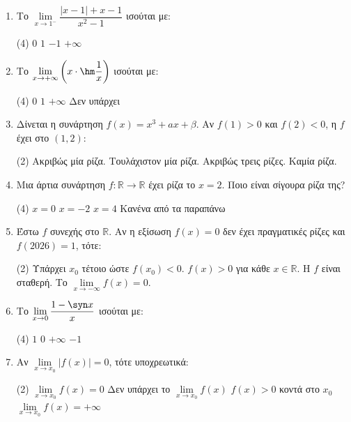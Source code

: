 \begin{enumerate}[label=\textbf{1.\arabic*.}, itemsep=4mm]
    \item Το $\lim\limits_{x \to 1^-} \dfrac{|x-1| + x - 1}{x^2 - 1}$ ισούται με:
    \begin{tasks}[label=\let\textdexiakeraia\relax\alph*.](4)
        \task $0$
        \task $1$
        \task $-1$
        \task $+\infty$
    \end{tasks}

    \item Το $\lim\limits_{x \to +\infty} \left( x \cdot \hm \dfrac{1}{x} \right)$ ισούται με:
    \begin{tasks}[label=\let\textdexiakeraia\relax\alph*.](4)
        \task $0$
        \task $1$
        \task $+\infty$
        \task Δεν υπάρχει
    \end{tasks}

    \item Δίνεται η συνάρτηση $f(x) = x^3 + a x + \beta$. Αν $f(1)>0$ και $f(2)<0$, η $f$ έχει στο $(1,2)$:
    \begin{tasks}[label=\let\textdexiakeraia\relax\alph*.](2)
        \task Ακριβώς μία ρίζα.
        \task Τουλάχιστον μία ρίζα.
        \task Ακριβώς τρεις ρίζες.
        \task Καμία ρίζα.
    \end{tasks}

    \item Μια άρτια συνάρτηση $f: \mathbb{R} \to \mathbb{R}$ έχει ρίζα το $x = 2$. Ποιο είναι σίγουρα ρίζα της?
    \begin{tasks}[label=\let\textdexiakeraia\relax\alph*.](4)
        \task $x = 0$
        \task $x = -2$
        \task $x = 4$
        \task Κανένα από τα παραπάνω
    \end{tasks}

    \item Έστω $f$ συνεχής στο $\mathbb{R}$. Αν η εξίσωση $f(x) = 0$ δεν έχει πραγματικές ρίζες και $f(2026) = 1$, τότε:
    \begin{tasks}[label=\let\textdexiakeraia\relax\alph*.](2)
        \task Υπάρχει $x_0$ τέτοιο ώστε $f(x_0) < 0$.
        \task $f(x) > 0$ για κάθε $x \in \mathbb{R}$.
        \task Η $f$ είναι σταθερή.
        \task Το $\lim\limits_{x \to -\infty} f(x) = 0$.
    \end{tasks}

    \item Το $\lim\limits_{x \to 0} \dfrac{1 - \syn x}{x}$ ισούται με:
    \begin{tasks}[label=\let\textdexiakeraia\relax\alph*.](4)
        \task $1$
        \task $0$
        \task $+\infty$
        \task $-1$
    \end{tasks}

    \item Αν $\lim\limits_{x \to x_0} |f(x)| = 0$, τότε υποχρεωτικά:
    \begin{tasks}[label=\let\textdexiakeraia\relax\alph*.](2)
        \task $\lim\limits_{x \to x_0} f(x) = 0$
        \task Δεν υπάρχει το $\lim\limits_{x \to x_0} f(x)$
        \task $f(x) > 0$ κοντά στο $x_0$
        \task $\lim\limits_{x \to x_0} f(x) = +\infty$
    \end{tasks}

\end{enumerate}


